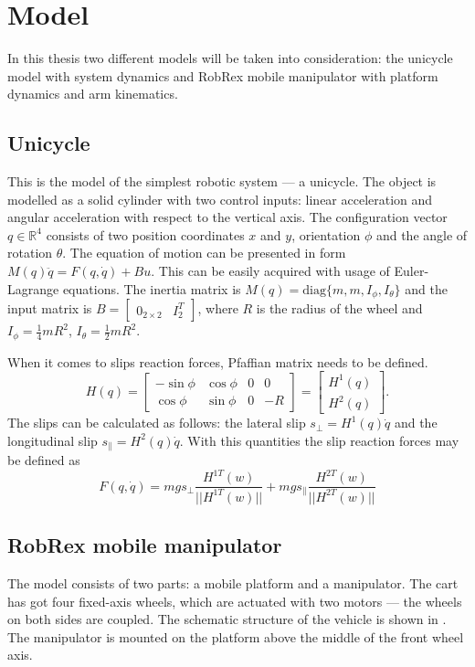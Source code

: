 \chapter{Model}
In this thesis two different models will be taken into consideration: the unicycle model with system dynamics and RobRex mobile manipulator with platform dynamics and arm kinematics.
\section{Unicycle}
This is the model of the simplest robotic system --- a unicycle. The object is modelled as a solid cylinder with two control inputs: linear acceleration and angular acceleration with respect to the vertical axis. The configuration vector $q\in \mathbb{R}^4$ consists of two position coordinates $x$ and $y$, orientation $\phi$ and the angle of rotation $\theta$. The equation of motion can be presented in form $M(q)\ddot q =F(q, \dot q)+Bu$. This can be easily acquired with usage of Euler-Lagrange equations. The inertia matrix is $M(q)=\mathrm{diag}\{m, m, I_\phi, I_\theta\}$ and the input matrix is $B=\begin{bmatrix}
0_{2 \times 2} & I_2^T
\end{bmatrix}$, where $R$ is the radius of the wheel and $I_\phi=\frac{1}{4}mR^2$, $I_\theta=\frac{1}{2}mR^2$.

When it comes to slips reaction forces, Pfaffian matrix needs to be defined.
\begin{equation*}
H(q)=\begin{bmatrix}
-\sin\phi & \cos\phi & 0 & 0\\
\cos\phi & \sin\phi & 0 & -R
\end{bmatrix}=\begin{bmatrix}
H^1(q)\\
H^2(q)
\end{bmatrix}.
\end{equation*}
The slips can be calculated as follows: the lateral slip $s_\perp=H^1(q)\dot q$ and the longitudinal slip $s_\parallel=H^2(q)\dot q$. With this quantities the slip reaction forces may be defined as 
\begin{equation*}
F(q, \dot q)=mgs_\perp\frac{H^{1T}(w)}{||H^{1T}(w)||} + mgs_\parallel\frac{H^{2T}(w)}{||H^{2T}(w)||}
\end{equation*}
\section{RobRex mobile manipulator}
The model consists of two parts: a mobile platform and a manipulator. The cart has got four fixed-axis wheels, which are actuated with two motors --- the wheels on both sides are coupled. The schematic structure of the vehicle is shown in . %
The manipulator is mounted on the platform above the middle of the front wheel axis.
